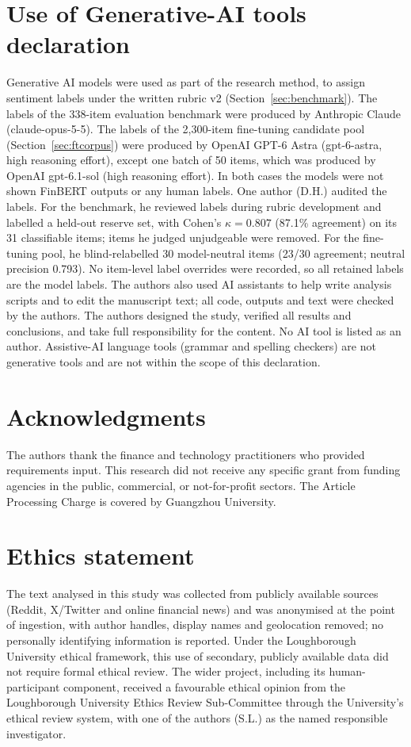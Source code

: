 \documentclass{aims}
\numberwithin{equation}{section}
\begin{document}
\section*{Use of Generative-AI tools declaration}
Generative AI models were used as part of the research method, to assign sentiment
labels under the written rubric v2 (Section~\ref{sec:benchmark}). The labels of the
338-item evaluation benchmark were produced by Anthropic Claude (claude-opus-5-5).
The labels of the 2{,}300-item fine-tuning candidate pool (Section~\ref{sec:ftcorpus})
were produced by OpenAI GPT-6 Astra (gpt-6-astra, high reasoning effort), except one
batch of 50 items, which was produced by OpenAI gpt-6.1-sol (high reasoning effort).
In both cases the models were not shown FinBERT outputs or any human labels. One author (D.H.) audited the labels. For the benchmark, he
reviewed labels during rubric development and labelled a held-out reserve set,
with Cohen's $\kappa = 0.807$ (87.1\% agreement) on its 31 classifiable items; items
he judged unjudgeable were removed. For the fine-tuning pool, he blind-relabelled
30 model-neutral items (23/30 agreement; neutral precision 0.793). No item-level
label overrides were recorded, so all retained labels are the model labels. The
authors also used AI assistants to help write analysis scripts and to edit the
manuscript text; all code, outputs and text were checked by the authors. The
authors designed the study, verified all results and conclusions, and take full
responsibility for the content. No AI tool is listed as an author. Assistive-AI
language tools (grammar and spelling checkers) are not generative tools and are not
within the scope of this declaration.

\section*{Acknowledgments}
The authors thank the finance and technology practitioners who provided
requirements input. This research did not receive any specific grant
from funding agencies in the public, commercial, or not-for-profit sectors. The
Article Processing Charge is covered by Guangzhou University.

\section*{Ethics statement}
The text analysed in this study was collected from publicly available sources
(Reddit, X/Twitter and online financial news) and was anonymised at the point of
ingestion, with author handles, display names and geolocation removed; no
personally identifying information is reported. Under the Loughborough University
ethical framework, this use of secondary, publicly available data did not require
formal ethical review. The wider project, including its human-participant component,
received a favourable ethical opinion from the Loughborough University Ethics Review
Sub-Committee through the University's ethical review system, with one of the
authors (S.L.) as the named responsible investigator.
\end{document}
